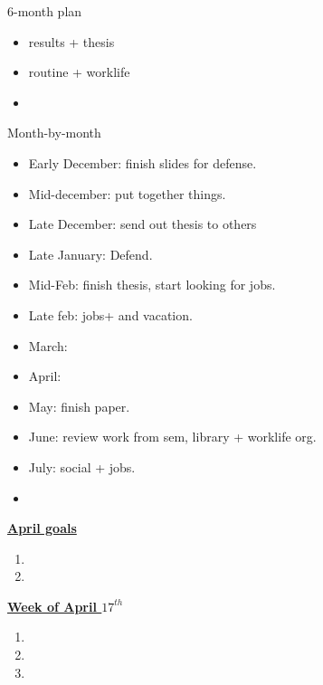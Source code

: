\documentclass[serif, mathserif, final]{beamer}
\begin{document}
{\begin{frame}{}
\begin{columns}
\begin{column}{0.5\linewidth}
    \begin{block}{ 6-month plan}
      \begin{itemize}
        \small \item \small results + thesis
      \item \small routine + worklife
      \item \small 
      \end{itemize}
    \end{block} 

    \begin{block}{Month-by-month}
      \begin{itemize}
      \item \small Early December: finish slides for defense.
      \item \small Mid-december: put together things. 
      \item \small Late December: send out thesis to others 
      \item \small Late January: Defend.
      \item \small Mid-Feb: finish thesis, start looking for jobs. 
      \item \small Late feb: jobs+ and vacation. 
      \item \small March: 
      \item \small April: 
      \item \small May: finish paper. 
      \item \small June: review work from sem, library + worklife
        org. 
      \item \small July: social + jobs. 
      \item \small 
      \end{itemize}
    \end{block}

\begin{block}{\underline{\textbf{April goals}}}
\begin{enumerate}
\small \item \small 
\item \small 
\end{enumerate}
\end{block}

\begin{block}{\small \underline{\textbf{Week of April $17^{th}$}}}
\begin{enumerate}
\tiny \item \tiny 
\item \tiny 
\item \tiny 
\end{enumerate}
\end{block}


\end{column}
\end{columns}
\end{frame}}
\end{document}
